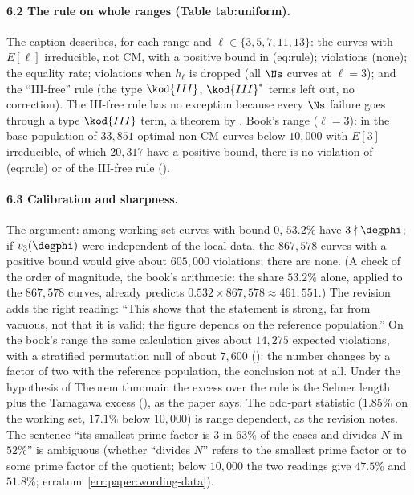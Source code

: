 \begin{sloppypar}
\paragraph{6.2 The rule on whole ranges (Table tab:uniform).} The caption describes, for each range and $\ell\in\{3,5,7,11,13\}$: the curves with $E[\ell]$ irreducible, not CM, with a positive
bound in (eq:rule); violations (none); the equality rate; violations when $h_\ell$ is dropped (all $\Ns$ curves at $\ell=3$); and the ``III-free'' rule (the type $\kod{III}$, $\kod{III}^*$ terms left out,
no correction). The III-free rule has no exception because every $\Ns$ failure goes through a type $\kod{III}$ term, a theorem by . Book's range ($\ell=3$): in the base
population of $33{,}851$ optimal non-CM curves below $10{,}000$ with $E[3]$ irreducible, of which $20{,}317$ have a positive bound, there is no violation of (eq:rule) or of the
III-free rule ().

\paragraph{6.3 Calibration and sharpness.} The argument: among working-set curves with bound $0$, $53.2\%$ have $3\nmid\degphi$; if $v_3(\degphi)$ were independent of the local data, the
$867{,}578$ curves with a positive bound would give about $605{,}000$ violations; there are none. (A check of the order of magnitude, the book's arithmetic: the share $53.2\%$ alone, applied to
the $867{,}578$ curves, already predicts $0.532\times867{,}578\approx461{,}551$.) The revision
adds the right reading: ``This shows that the statement is strong, far from vacuous, not that it is valid; the figure depends on the reference population.'' On the book's range
the same calculation gives about $14{,}275$ expected violations, with a stratified permutation null of about $7{,}600$ (): the number changes by a factor of two with the
reference population, the conclusion not at all. Under the hypothesis of Theorem thm:main the excess over the rule is the Selmer length plus the Tamagawa excess
(), as the paper says. The odd-part statistic ($1.85\%$ on the working set, $17.1\%$ below $10{,}000$) is range dependent, as the revision notes. The sentence
``its smallest prime factor is $3$ in $63\%$ of the cases and divides $N$ in $52\%$'' is ambiguous (whether ``divides $N$'' refers to the smallest prime factor or to some prime factor
of the quotient; below $10{,}000$ the two readings give $47.5\%$ and $51.8\%$; erratum~\ref{err:paper:wording-data}).


\end{sloppypar}
